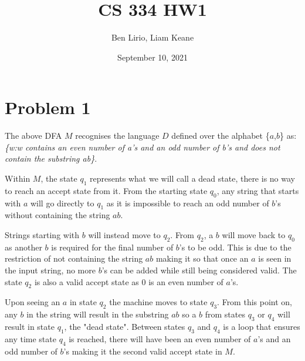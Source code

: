 \documentclass{article}
\title{CS 334 HW1}
\author{Ben Lirio, Liam Keane}
\date{September 10, 2021}
\begin{document}
\maketitle

\section*{Problem 1}
\begin{center}
\end{center}
The above DFA $M$ recognises the language $D$ defined over the alphabet \{$a$,$b$\} as:
\emph{\{w:w contains an even number of a's and an odd number of b's and does not contain the substring ab\}}. 

Within $M$, the state $q_1$ represents what we will call a dead state, there is no way to reach an accept state from it. From the starting state $q_0$, any string that starts with $a$ will go directly to $q_1$ as it is impossible to reach an odd number of $b$'s without containing the string $ab$. 

Strings starting with $b$ will instead move to $q_2$. From $q_2$, a $b$ will move back to $q_0$ as another $b$ is required for the final number of $b$'s to be odd. This is due to the restriction of not containing the string $ab$ making it so that once an $a$ is seen in the input string, no more $b$'s can be added while still being considered valid. The state $q_2$ is also a valid accept state as 0 is an even number of $a$'s.

Upon seeing an $a$ in state $q_2$ the machine moves to state $q_3$. From this point on, any $b$ in the string will result in the substring $ab$ so a $b$ from states $q_3$ or $q_4$ will result in state $q_1$, the "dead state". Between states $q_3$ and $q_4$ is a loop that ensures any time state $q_4$ is reached, there will have been an even number of $a$'s and an odd number of $b$'s making it the second valid accept state in $M$.
\end{document}
